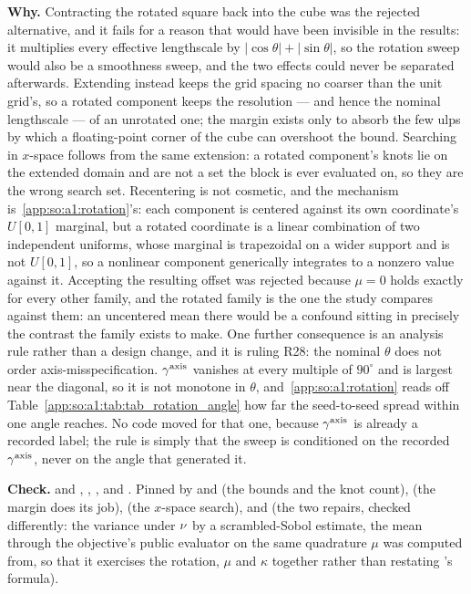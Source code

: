 \textbf{Why.} Contracting the rotated square back into the cube was the
rejected alternative, and it fails for a reason that would have been invisible
in the results: it multiplies every effective lengthscale by
$|\cos\theta|+|\sin\theta|$, so the rotation sweep would also be a smoothness
sweep, and the two effects could never be separated afterwards. Extending
instead keeps the grid spacing no coarser than the unit grid's, so a rotated
component keeps the resolution --- and hence the nominal lengthscale --- of an
unrotated one; the margin exists only to absorb the few ulps by which a
floating-point corner of the cube can overshoot the bound. Searching in
$x$-space follows from the same extension: a rotated component's knots lie on
the extended domain and are not a set the block is ever evaluated on, so they
are the wrong search set. Recentering is not cosmetic, and the mechanism
is~\ref{app:so:a1:rotation}'s: each component is centered against its own
coordinate's $U[0,1]$ marginal, but a rotated coordinate is a linear
combination of two independent uniforms, whose marginal is trapezoidal on a
wider support and is not $U[0,1]$, so a nonlinear component generically
integrates to a nonzero value against it. Accepting the resulting offset was
rejected because $\mu=0$ holds exactly for every other family, and the rotated
family is the one the study compares against them: an uncentered mean there
would be a confound sitting in precisely the contrast the family exists to
make. One further consequence is an analysis rule rather than a design change,
and it is ruling R28: the nominal $\theta$ does not order
axis-misspecification. $\gamma^{\mathrm{axis}}$ vanishes at every multiple of $90^\circ$ and is
largest near the diagonal, so it is not monotone in $\theta$,
and~\ref{app:so:a1:rotation} reads off
Table~\ref{app:so:a1:tab:tab_rotation_angle} how far the seed-to-seed spread
within one angle reaches. No code moved for that one, because $\gamma^{\mathrm{axis}}$ is
already a recorded label; the rule is simply that the sweep is conditioned on
the recorded $\gamma^{\mathrm{axis}}$, never on the angle that generated it.

\begin{sloppypar}
\textbf{Check.}  and ,
,
,
 and
. Pinned by
 and
 (the bounds and
the knot count),
(the margin does its job),
(the $x$-space search),
 and
(the two repairs, checked differently: the variance under $\nu$ by a
scrambled-Sobol estimate, the mean through the objective's public evaluator on
the same quadrature $\mu$ was computed from, so that it exercises the rotation,
$\mu$ and $\kappa$ together rather than restating
's formula).
\end{sloppypar}

